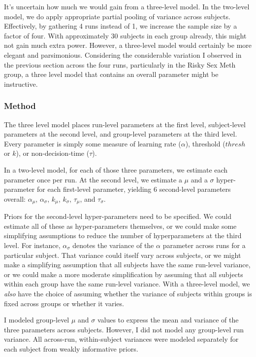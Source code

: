 \documentclass[]{article}
\begin{document}
It's uncertain how much we would gain from a three-level model. In the
two-level model, we do apply appropriate partial pooling of variance
across subjects. Effectively, by gathering 4 runs instead of 1, we
increase the sample size by a factor of four. With approximately 30
subjects in each group already, this might not gain much extra power.
However, a three-level model would certainly be more elegant and
parsimonious. Considering the considerable variation I observed in the
previous section across the four runs, particularly in the Risky Sex
Meth group, a three level model that contains an overall parameter might
be instructive.

\subsubsection{Method}\label{method-1}

The three level model places run-level parameters at the first level,
subject-level parameters at the second level, and group-level parameters
at the third level. Every parameter is simply some measure of learning
rate (\(\alpha\)), threshold (\(thresh\) or \(k\)), or non-decision-time
(\(\tau\)).

In a two-level model, for each of those three parameters, we estimate
each parameter once per run. At the second level, we estimate a \(\mu\)
and a \(\sigma\) hyper-parameter for each first-level parameter,
yielding 6 second-level parameters overall: \(\alpha_{\mu}\),
\(\alpha_{\sigma}\), \(k_{\mu}\), \(k_{\sigma}\), \(\tau_{\mu}\), and
\(\tau_{\sigma}\).

Priors for the second-level hyper-parameters need to be specified. We
could estimate all of these as hyper-parameters themselves, or we could
make some simplifying assumptions to reduce the number of
hyperparameters at the third level. For instance, \(\alpha_{\sigma}\)
denotes the variance of the \(\alpha\) parameter across runs for a
particular subject. That variance could itself vary across subjects, or
we might make a simplifying assumption that all subjects have the same
run-level variance, or we could make a more moderate simplification by
assuming that all subjects within each group have the same run-level
variance. With a three-level model, we \emph{also} have the choice of
assuming whether the variance of subjects within groups is fixed across
groups or whether it varies.

I modeled group-level \(\mu\) and \(\sigma\) values to express the mean
and variance of the three parameters across subjects. However, I did not
model any group-level run variance. All across-run, within-subject
variances were modeled separately for each subject from weakly
informative priors.
\end{document}

